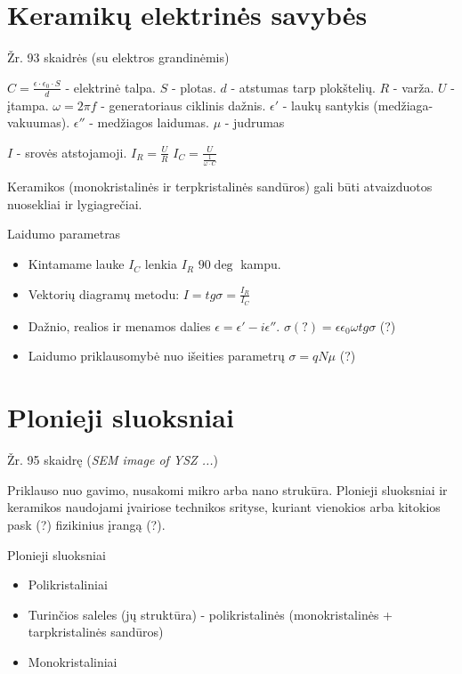 \section{Keramikų elektrinės savybės}

Žr. 93 skaidrės (su elektros grandinėmis)

$C = \frac{\epsilon \cdot \epsilon_0 \cdot S}{d}$ - elektrinė talpa.
$S$ - plotas.
$d$ - atstumas tarp plokštelių.
$R$ - varža.
$U$ - įtampa.
$\omega = 2 \pi f$ - generatoriaus ciklinis dažnis.
$\epsilon'$ - laukų santykis (medžiaga-vakuumas).
$\epsilon''$ - medžiagos laidumas.
$\mu$ - judrumas

$I$ - srovės atstojamoji.
$I_R = \frac{U}{R}$
$I_C = \frac{U}{\frac{1}{\omega \cdot C}}$

\begin{remember}
  \item Keramikos (monokristalinės ir terpkristalinės sandūros) gali
  būti atvaizduotos nuosekliai ir lygiagrečiai.
  \item Laidumo parametras\begin{itemize}
    \item Kintamame lauke $I_C$ lenkia $I_R$ $90\deg$ kampu.
    \item Vektorių diagramų metodu: $I = tg \sigma = \frac{I_R}{I_C}$
    \item Dažnio, realios ir menamos dalies
    $\epsilon = \epsilon' - i\epsilon''$.
    $\sigma (?) = \epsilon \epsilon_0 \omega tg \sigma$ (?)
    \item Laidumo priklausomybė nuo išeities parametrų
    $\sigma = qN\mu$ (?)
  \end{itemize}
\end{remember}


\section{Plonieji sluoksniai}
Žr. 95 skaidrę (\textit{SEM image of YSZ ...})

Priklauso nuo gavimo, nusakomi mikro arba nano strukūra.
Plonieji sluoksniai ir keramikos naudojami įvairiose technikos srityse,
kuriant vienokios arba kitokios pask (?) fizikinius įrangą (?).

Plonieji sluoksniai\begin{itemize}
  \item Polikristaliniai
  \item Turinčios saleles (jų struktūra) - polikristalinės
  (monokristalinės + tarpkristalinės sandūros)
  \item Monokristaliniai
\end{itemize}

